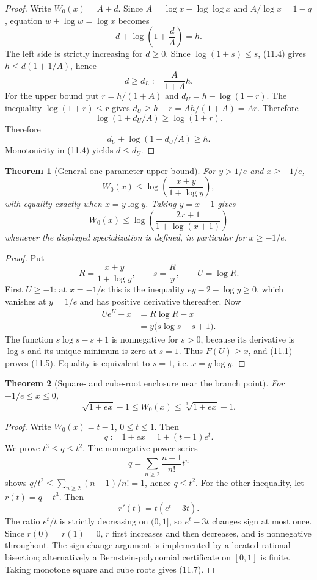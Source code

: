 \documentclass[11pt]{article}
\newtheorem{theorem}{Theorem}[section]
\theoremstyle{definition}
\begin{document}
\begin{proof}
Write \(W_0(x)=A+d\).  Since
\(A=\log x-\log\log x\) and \(A/\log x=1-q\), equation
\(w+\log w=\log x\) becomes
\[
 d+\log\left(1+\frac dA\right)=h.
 \tag{11.4}
\]
The left side is strictly increasing for \(d\ge0\).  Since
\(\log(1+s)\le s\), (11.4) gives
\(h\le d(1+1/A)\), hence
\[
 d\ge d_L:=\frac{A}{1+A}h.
\]
For the upper bound put
\(r=h/(1+A)\) and
\(d_U=h-\log(1+r)\).  The inequality \(\log(1+r)\le r\) gives
\(d_U\ge h-r=Ah/(1+A)=Ar\).  Therefore
\[
 \log(1+d_U/A)\ge\log(1+r).
\]
Therefore
\[
 d_U+\log(1+d_U/A)\ge h.
\]
Monotonicity in (11.4) yields \(d\le d_U\).
\end{proof}

\begin{theorem}[General one-parameter upper bound]\label{thm:general-upper}
For \(y>1/e\) and \(x\ge-1/e\),
\[
 W_0(x)\le
 \log\left(\frac{x+y}{1+\log y}\right),
 \tag{11.5}
\]
with equality exactly when \(x=y\log y\).  Taking \(y=x+1\) gives
\[
 W_0(x)\le
 \log\left(\frac{2x+1}{1+\log(x+1)}\right)
 \tag{11.6}
\]
whenever the displayed specialization is defined, in particular for
\(x\ge-1/e\).
\end{theorem}

\begin{proof}
Put
\[
 R=\frac{x+y}{1+\log y},\qquad s=\frac{R}{y},\qquad U=\log R.
\]
First \(U\ge-1\): at \(x=-1/e\) this is the inequality
\(ey-2-\log y\ge0\), which vanishes at \(y=1/e\) and has positive derivative
thereafter.  Now
\begin{align*}
 Ue^U-x
 &=R\log R-x\\
 &=y\bigl(s\log s-s+1\bigr).
\end{align*}
The function \(s\log s-s+1\) is nonnegative for \(s>0\), because its derivative
is \(\log s\) and its unique minimum is zero at \(s=1\).  Thus
\(F(U)\ge x\), and (11.1) proves (11.5).  Equality is equivalent to
\(s=1\), i.e. \(x=y\log y\).
\end{proof}

\begin{theorem}[Square- and cube-root enclosure near the branch point]\label{thm:root-bounds}
For \(-1/e\le x\le0\),
\[
 \sqrt{1+ex}-1\le W_0(x)\le\sqrt[3]{1+ex}-1.
 \tag{11.7}
\]
\end{theorem}

\begin{proof}
Write \(W_0(x)=t-1\), \(0\le t\le1\).  Then
\[
 q:=1+ex=1+(t-1)e^t.
 \tag{11.8}
\]
We prove \(t^3\le q\le t^2\).  The nonnegative power series
\[
 q=\sum_{n\ge2}\frac{n-1}{n!}t^n
 \tag{11.9}
\]
shows
\(q/t^2\le\sum_{n\ge2}(n-1)/n!=1\), hence \(q\le t^2\).
For the other inequality, let \(r(t)=q-t^3\).  Then
\[
 r'(t)=t(e^t-3t).
\]
The ratio \(e^t/t\) is strictly decreasing on \((0,1]\), so
\(e^t-3t\) changes sign at most once.  Since \(r(0)=r(1)=0\), \(r\) first
increases and then decreases, and is nonnegative throughout.  The sign-change
argument is implemented by a located rational bisection; alternatively a
Bernstein-polynomial certificate on \([0,1]\) is finite.  Taking monotone
square and cube roots gives (11.7).
\end{proof}
\end{document}
